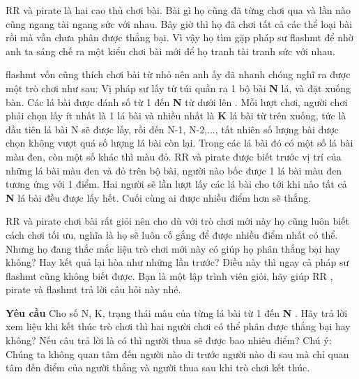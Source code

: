 RR   và   pirate   là hai cao thủ chơi bài. Bài gì họ cũng đã từng chơi qua và lần nào cũng ngang tài ngang sức với nhau. Bây giờ thì họ đã chơi tất cả các thể loại bài rồi mà vẫn chưa phân được thắng bại. Vì vậy họ tìm gặp pháp sư   flashmt   để nhờ anh ta sáng chế ra một kiểu chơi bài mới để họ tranh tài tranh sức với nhau.  

flashmt   vốn cũng thích chơi bài từ nhỏ nên anh ấy đã nhanh chóng nghĩ ra được một trò chơi như sau: Vị pháp sư lấy từ túi quần ra 1 bộ bài   \textbf{    N   }   lá, và đặt xuống bàn.       Các lá bài được đánh số từ 1 đến    \textbf{     N    }    từ dưới lên      . Mỗi lượt chơi, người chơi phải chọn lấy ít nhất là 1 lá bài và nhiều nhất là   \textbf{    K   }   lá bài từ trên xuống, tức là đầu tiên lá bài N sẽ được lấy, rồi đến N-1, N-2,..., tất nhiên số lượng bài được chọn không vượt quá số lượng lá bài còn lại. Trong các lá bài đó có một số lá bài màu đen, còn một số khác thì màu đỏ.   RR   và   pirate   được biết trước vị trí của những lá bài màu đen và đỏ trên bộ bài, người nào bốc được 1 lá bài màu đen tương ứng với 1 điểm. Hai người sẽ lần lượt lấy các lá bài cho tới khi nào tất cả   \textbf{    N   }   lá bài đều được lấy hết. Cuối cùng ai được nhiều điểm hơn sẽ thắng.  

RR   và   pirate   chơi bài rất giỏi nên cho dù với trò chơi mới này họ cũng luôn biết cách chơi tối ưu, nghĩa là họ sẽ luôn cố gắng để được nhiều điểm nhất có thể. Nhưng họ đang thắc mắc liệu trò chơi mới này có giúp họ phân thắng bại hay không? Hay kết quả lại hòa như những lần trước? Điều này thì ngay cả pháp sư   flashmt   cũng không biết được. Bạn là một lập trình viên giỏi, hãy giúp   RR   ,   pirate   và   flashmt   trả lời câu hỏi này nhé.  

\textbf{    Yêu cầu   }
Cho số N, K, trạng thái màu của từng lá bài từ 1 đến   \textbf{    N   }   . Hãy trả lời xem liệu khi kết thúc trò chơi thì hai người chơi có thể phân được thắng bại hay không? Nếu câu trả lời là có thì người       thua      sẽ được bao nhiêu điểm? Chú ý: Chúng ta không quan tâm đến người nào đi trước người nào đi sau mà chỉ quan tâm đến điểm của người thắng và người thua sau khi trò chơi kết thúc.
